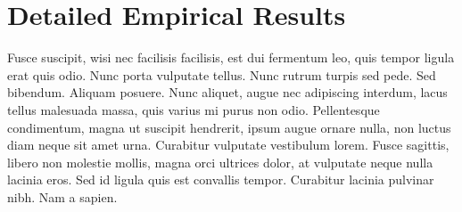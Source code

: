 \documentclass[acmsmall, anonymous]{acmart}
\begin{document}
\section{Detailed Empirical Results}

Fusce suscipit, wisi nec facilisis facilisis, est dui fermentum leo, quis tempor
ligula erat quis odio. Nunc porta vulputate tellus. Nunc rutrum turpis sed pede.
Sed bibendum. Aliquam posuere. Nunc aliquet, augue nec adipiscing interdum,
lacus tellus malesuada massa, quis varius mi purus non odio. Pellentesque
condimentum, magna ut suscipit hendrerit, ipsum augue ornare nulla, non luctus
diam neque sit amet urna. Curabitur vulputate vestibulum lorem. Fusce sagittis,
libero non molestie mollis, magna orci ultrices dolor, at vulputate neque nulla
lacinia eros. Sed id ligula quis est convallis tempor. Curabitur lacinia
pulvinar nibh. Nam a sapien.
\end{document}
